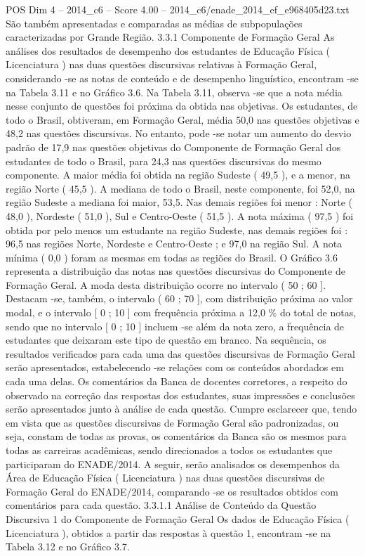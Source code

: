 \begin{textsample}{POS Dim 4 – 2014\_c6 – Score 4.00 – 2014\_c6/enade\_2014\_ef\_e968405d23.txt}
São também apresentadas e comparadas as médias de subpopulações caracterizadas por Grande Região. 3.3.1 Componente de Formação Geral As análises dos resultados de desempenho dos estudantes de Educação Física ( Licenciatura ) nas duas questões discursivas relativas à Formação Geral, considerando -se as notas de conteúdo e de desempenho linguístico, encontram -se na Tabela 3.11 e no Gráfico 3.6.
Na Tabela 3.11, observa -se que a nota média nesse conjunto de questões foi próxima da obtida nas objetivas.
Os estudantes, de todo o Brasil, obtiveram, em Formação Geral, média 50,0 nas questões objetivas e 48,2 nas questões discursivas.
No entanto, pode -se notar um aumento do desvio padrão de 17,9 nas questões objetivas do Componente de Formação Geral dos estudantes de todo o Brasil, para 24,3 nas questões discursivas do mesmo componente.
A maior média foi obtida na região Sudeste ( 49,5 ), e a menor, na região Norte ( 45,5 ).
A mediana de todo o Brasil, neste componente, foi 52,0, na região Sudeste a mediana foi maior, 53,5.
Nas demais regiões foi menor : Norte ( 48,0 ), Nordeste ( 51,0 ), Sul e Centro-Oeste ( 51,5 ).
A nota máxima ( 97,5 ) foi obtida por pelo menos um estudante na região Sudeste, nas demais regiões foi : 96,5 nas regiões Norte, Nordeste e Centro-Oeste ; e 97,0 na região Sul.
A nota mínima ( 0,0 ) foram as mesmas em todas as regiões do Brasil.
O Gráfico 3.6 representa a distribuição das notas nas questões discursivas do Componente de Formação Geral.
A moda desta distribuição ocorre no intervalo ( 50 ; 60 ].
Destacam -se, também, o intervalo ( 60 ; 70 ], com distribuição próxima ao valor modal, e o intervalo [ 0 ; 10 ] com frequência próxima a 12,0 \% do total de notas, sendo que no intervalo [ 0 ; 10 ] incluem -se além da nota zero, a frequência de estudantes que deixaram este tipo de questão em branco.
Na sequência, os resultados verificados para cada uma das questões discursivas de Formação Geral serão apresentados, estabelecendo -se relações com os conteúdos abordados em cada uma delas.
Os comentários da Banca de docentes corretores, a respeito do observado na correção das respostas dos estudantes, suas impressões e conclusões serão apresentados junto à análise de cada questão.
Cumpre esclarecer que, tendo em vista que as questões discursivas de Formação Geral são padronizadas, ou seja, constam de todas as provas, os comentários da Banca são os mesmos para todas as carreiras acadêmicas, sendo direcionados a todos os estudantes que participaram do ENADE/2014.
A seguir, serão analisados os desempenhos da Área de Educação Física ( Licenciatura ) nas duas questões discursivas de Formação Geral do ENADE/2014, comparando -se os resultados obtidos com comentários para cada questão. 3.3.1.1 Análise de Conteúdo da Questão Discursiva 1 do Componente de Formação Geral Os dados de Educação Física ( Licenciatura ), obtidos a partir das respostas à questão 1, encontram -se na Tabela 3.12 e no Gráfico 3.7.

\end{textsample}
